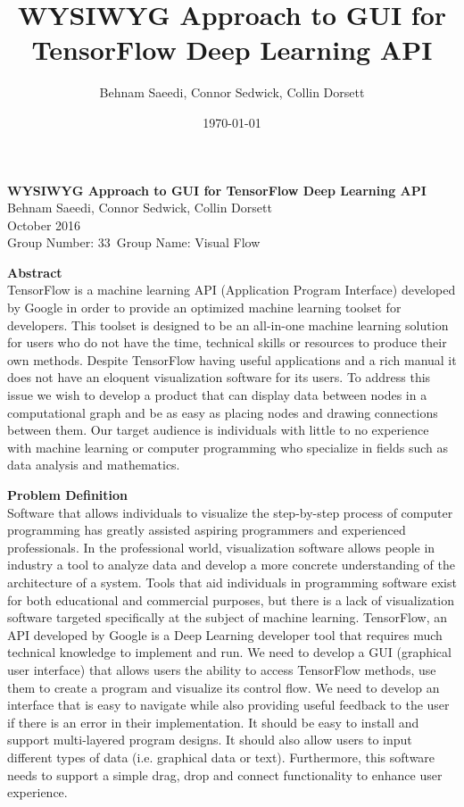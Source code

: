 \documentclass[a4paper,10pt]{IEEEtran} \usepackage[margin=1.0in]{geometry} \usepackage{pdfpages} \usepackage{graphicx}
\title{WYSIWYG Approach to GUI for TensorFlow Deep Learning API}
\author{Behnam Saeedi, Connor Sedwick, Collin Dorsett}
\date{\today}
\newcommand*\Title{WYSIWYG Approach to GUI for TensorFlow Deep Learning API}
\newcommand*\Date{October 2016}
\newcommand*\Author{Behnam Saeedi, Connor Sedwick, Collin Dorsett}
\newcommand*\GroupNumber{Group Number: 33}
\newcommand*\GroupName{Group Name: Visual Flow}
\begin{document}
	\begin{titlepage}
%	
		\vspace*{\fill}
			\begin{center}
				\noindent \textbf{\Huge\Title} \\ 
				\large\Author \\ 
				\large\Date \\ 
				\large\GroupNumber \, \large\GroupName 
			\end{center}
			\noindent \textbf{Abstract} \\
			\indent TensorFlow is a machine learning API (Application Program Interface) developed by Google in order to provide an optimized machine learning toolset for developers.
			 This toolset is designed to be an all-in-one machine learning solution for users who do not have the time, technical skills or resources to produce their own methods.
			 Despite TensorFlow having useful applications and a rich manual it does not have an eloquent visualization software for its users.
			 To address this issue we wish to develop a product that can display data between nodes in a computational graph and be as easy as placing nodes and drawing connections between them. Our target audience is individuals with little to no experience with machine learning or computer programming who specialize in fields such as data analysis and mathematics.\\
		\vspace*{\fill}
	\end{titlepage}

	\noindent \textbf{Problem Definition}\\
	\indent Software that allows individuals to visualize the step-by-step process of computer programming has greatly assisted aspiring programmers and experienced professionals.
	In the professional world, visualization software allows people in industry a tool to analyze data and develop a more concrete understanding of the architecture of a system. 
	Tools that aid individuals in programming software exist for both educational and commercial purposes, but there is a lack of visualization software targeted specifically at the subject of machine learning.
	TensorFlow, an API developed by Google is a Deep Learning developer tool that requires much technical knowledge to implement and run.
	 We need to develop a GUI (graphical user interface) that allows users the ability to access TensorFlow methods, use them to create a program and visualize its control flow.
	 We need to develop an interface that is easy to navigate while also providing useful feedback to the user if there is an error in their implementation.
	 It should be easy to install and support multi-layered program designs. It should also allow users to input different types of data (i.e. graphical data or text).
	 Furthermore, this software needs to support a simple drag, drop and connect functionality to enhance user experience.\\
\end{document}

